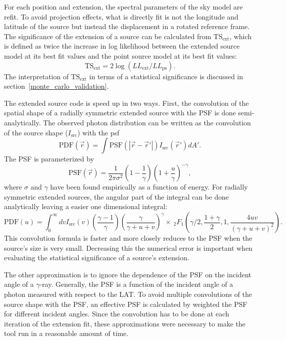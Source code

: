 \documentclass[12pt,preprint]{aastex}
\newcommand{\tsext}{{\ensuremath{\text{TS}_\text{ext}}}\xspace}
\begin{document}
For each position and extension,
the spectral parameters of the sky model are refit. To avoid projection
effects, what is directly fit is not the longitude and latitude of
the source but instead the displacement in a rotated reference frame.
The significance of the extension of a source can be calculated from
\tsext, which is defined as twice the increase in log likelihood between
the extended source model at its best fit values and the
point source model at its best fit values:
\begin{equation}
  \tsext=2\log(LL_\text{ext}/LL_\text{ps}).
\end{equation}
The interpretation of \tsext in terms of a statistical significance is
discussed in section~\ref{monte_carlo_validation}.

The extended source code is speed up in two ways. First, the convolution
of the spatial shape of a radially symmetric extended source with the PSF is
done semi-analytically. The observed photon
distribution can be written as the convolution of the source shape ($I_\text{src}$)
with the psf
\begin{equation}
  \text{PDF}(\vec r) = \int  \text{PSF}(|\vec r - \vec r'|)I_\text{src}(\vec r') d A'.
\end{equation}
The PSF is parameterized by
\begin{equation}
  \text{PSF}(\vec r) = 
  \frac{1}{2\pi\sigma^2}
  \left(1-\frac{1}{\gamma}\right)
  \left(1+\frac{u}{\gamma}\right)^{-\gamma},
\end{equation}
where $\sigma$ and $\gamma$ have been found empirically as a function
of energy.  For radially symmetric
extended sources, the angular part of the integral can be done analytically
leaving a easier one dimensional integral:
\begin{equation}
  \text{PDF}(u)= \int_0^\infty dv
  I_\text{src}(v) 
  \left(\frac{\gamma-1}{\gamma}\right)
  \left( \frac{\gamma}{\gamma + u + v}\right)^\gamma 
  \times ~_2F_1 \left(\gamma/2,\frac{1+\gamma}{2},1,\frac{4uv}{(\gamma+u+v)^2}\right).
\end{equation}
This convolution formula is faster and more closely reduces to the PSF
when the source's size is very small. Decreasing this the numerical
error is important when evaluating the statistical significance of a
source's extension.

The other approximation is to ignore the dependence of the PSF on the
incident angle of a $\gamma$-ray.  Generally, the PSF is a function
of the incident angle of a photon measured with respect to the LAT.
To avoid multiple convolutions of the source shape with the PSF, an
effective PSF is calculated by weighted the PSF for different incident
angles.  Since the convolution has to be done at each iteration of the
extension fit, these approximations were necessary to make the tool run
in a reasonable amount of time.
\end{document}
